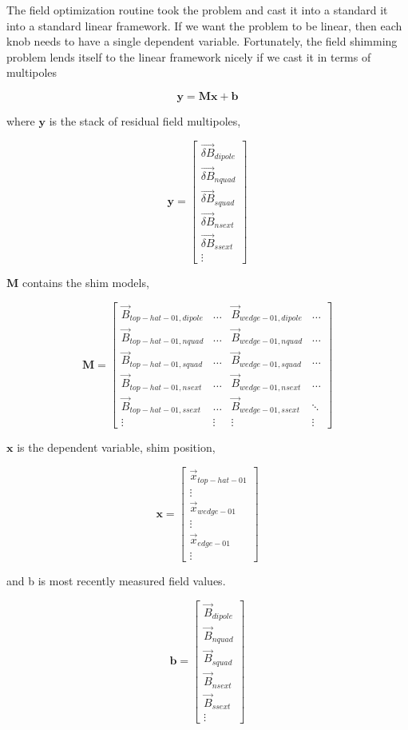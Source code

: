 The field optimization routine took the problem and cast it into a standard it into a standard linear framework.  If we want the problem to be linear, then each knob needs to have a single dependent variable.  Fortunately, the field shimming problem lends itself to the linear framework nicely if we cast it in terms of multipoles

\[
\mathbf{y} = \mathbf{M} \mathbf{x} + \mathbf{b}
\]

where $\mathbf{y}$ is the stack of residual field multipoles, 

\[
\mathbf{y} = \begin{bmatrix}
\vec{\delta B}_{dipole}    \\
\vec{\delta B}_{nquad} \\
\vec{\delta B}_{squad} \\
\vec{\delta B}_{nsext} \\ 
\vec{\delta B}_{ssext} \\
\vdots
\end{bmatrix}
\]

$\mathbf{M}$ contains the shim models, 

\[
\mathbf{M} = \begin{bmatrix}
\vec{B}_{top-hat-01,dipole} & \hdots & \vec{B}_{wedge-01,dipole} & \hdots \\
\vec{B}_{top-hat-01,nquad}  & \hdots & \vec{B}_{wedge-01,nquad} & \hdots \\
\vec{B}_{top-hat-01,squad}  & \hdots & \vec{B}_{wedge-01,squad} & \hdots \\
\vec{B}_{top-hat-01,nsext}  & \hdots & \vec{B}_{wedge-01,nsext} & \hdots \\ 
\vec{B}_{top-hat-01,ssext}  & \hdots & \vec{B}_{wedge-01,ssext} & \ddots \\
\vdots & \vdots & \vdots & \vdots
\end{bmatrix}
\]

$\mathbf{x}$ is the dependent variable, shim position, 

\[
\mathbf{x} = \begin{bmatrix}
\vec{x}_{top-hat-01} \\
\vdots \\
\vec{x}_{wedge-01} \\
\vdots \\
\vec{x}_{edge-01} \\
\vdots
\end{bmatrix}
\]

and b is most recently measured field values.

\[
\mathbf{b} = \begin{bmatrix}
\vec{B}_{dipole} \\
\vec{B}_{nquad}  \\
\vec{B}_{squad}  \\
\vec{B}_{nsext}  \\ 
\vec{B}_{ssext}  \\
\vdots
\end{bmatrix}
\]

